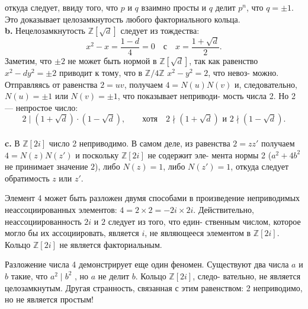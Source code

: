 \documentclass{mai_book}
\begin{document}
откуда следует, ввиду того, что $p$ и $q$ взаимно просты и $q$ делит $p^n$,\linebreak
что $q=\pm1$. Это доказывает целозамкнутость любого факториального\linebreak
кольца.\newline
\\
\hspace*{15pt}\textbf{b.} Нецелозамкнутость $\mathbb{Z}[\sqrt{d}]$ следует из тождества:
$$x^2-x=\frac{1-d}{4}=0\quad \text{с}\quad x=\frac{1+\sqrt{d}}{2}.$$
\newpage
%
%
\noindent Заметим, что $\pm2$ не может быть нормой в $\mathbb{Z}[\sqrt{d}]$, так как равенство\linebreak
$x^2-dy^2=\pm2$ приводит к тому, что в $\mathbb{Z}/4\mathbb{Z}$ $x^2-y^2=2$, что невоз-\linebreak
можно. Отправляясь от равенства $2=uv$, получаем $4=N(u)N(v)$ и,\linebreak
следовательно, $N(u)=\pm1$ или $N(v)=\pm1$, что показывает неприводи-\linebreak
мость числа 2. Но 2 — непростое число:
$$2\mid(1+\sqrt{d})\cdot(1-\sqrt{d}),\qquad\text{хотя}\quad 2\nmid(1+\sqrt{d})\text{ и }2\nmid(1-\sqrt{d}).$$
\\
\hspace*{15pt}\textbf{c.} В $\mathbb{Z}[2i]$ число 2 неприводимо. В самом деле, из равенства\linebreak
$2=zz'$ получаем $4=N(z)N(z')$ и поскольку $\mathbb{Z}[2i]$ не содержит эле-\linebreak
мента нормы 2 ($a^2+4b^2$ не принимает значение $2$), либо $N(z)=1$, либо\linebreak
$N(z')=1$, откуда следует обратимость $z$ или $z'$.

Элемент 4 может быть разложен двумя способами в произведение\linebreak
неприводимых неассоциированных элементов: $4=2\times2=-2i\times2i$.\linebreak
Действительно, неассоциированность $2i$ и $2$ следует из того, что един-\linebreak
ственным числом, которое могло бы их ассоциировать, является $i$, не\linebreak
являющееся элементом в $\mathbb{Z}[2i]$. Кольцо $\mathbb{Z}[2i]$ не является факториаль­ным.\linebreak

Разложение числа 4 демонстрирует еще один феномен. Существуют\linebreak
два числа $a$ и $b$ такие, что $a^2\mid b^2$ , но $a$ не делит $b$. Кольцо $\mathbb{Z}[2i]$, следо-\linebreak
вательно, не является целозамкнутым. Другая странность, связанная с\linebreak
этим равенством: 2 неприводимо, но не является простым!
\end{document}
